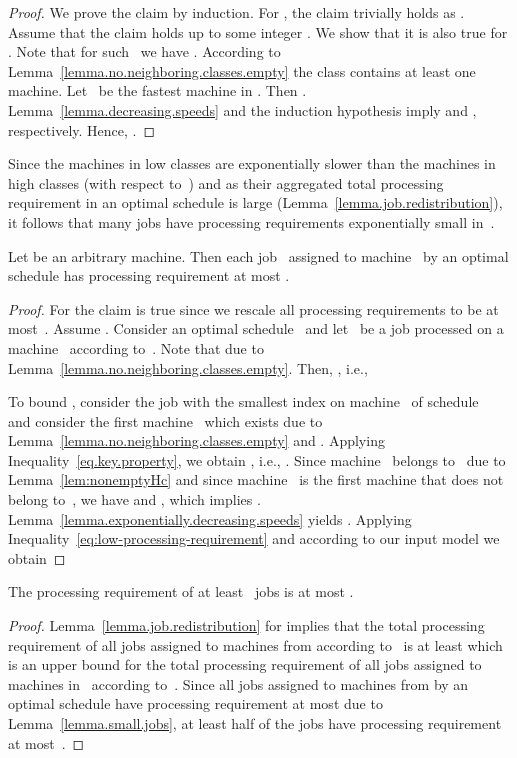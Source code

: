 \documentclass[a4paper,11pt,fleqn]{article}
\begin{document}
\begin{proof}
We prove the claim by induction. For , the claim trivially holds as . Assume that the claim holds up to some integer . We show that it is also true for . Note that for such~ we have . According to Lemma~\ref{lemma.no.neighboring.classes.empty} the class  contains at least one machine. Let~ be the fastest machine in . Then . Lemma~\ref{lemma.decreasing.speeds} and the induction hypothesis imply  and , respectively. Hence, .
\end{proof}

Since the machines in low classes are exponentially slower than the machines in high classes (with respect to~) and as their aggregated total processing requirement in an optimal schedule is large (Lemma~\ref{lemma.job.redistribution}), it follows that many jobs have processing requirements exponentially small in~. 

\begin{lemma}
\label{lemma.small.jobs}
Let  be an arbitrary machine. Then each job~ assigned to machine~ by an optimal schedule has processing requirement at most .
\end{lemma}

\begin{proof}
For  the claim is true since we rescale all processing requirements to be at most~. Assume . Consider an optimal schedule~ and
let~ be a job processed on a machine~ according to~. Note that  due to Lemma~\ref{lemma.no.neighboring.classes.empty}. Then, , i.e.,

To bound , consider the job  with the smallest index on machine~ of schedule~ and consider the first machine~ which exists due to Lemma~\ref{lemma.no.neighboring.classes.empty} and . Applying Inequality~\eqref{eq.key.property}, we obtain , i.e., . Since machine~ belongs to~ due to Lemma~\ref{lem:nonemptyHc} and since machine~ is the first machine that does not belong to~, we have  and , which implies . Lemma~\ref{lemma.exponentially.decreasing.speeds} yields . Applying Inequality~\ref{eq:low-processing-requirement} and  according to our input model we obtain

\end{proof}

\begin{cor}
\label{corol.many.small.jobs}
The processing requirement of at least~ jobs is at most .
\end{cor}

\begin{proof}
Lemma~\ref{lemma.job.redistribution} for  implies that the total
processing requirement of all jobs assigned to machines from  according to~ is at least 
which is an upper bound for the total processing requirement of all jobs
assigned to machines in~ according to~. Since all jobs assigned to machines from  by an optimal schedule have processing requirement at most  due to Lemma~\ref{lemma.small.jobs}, at
least half of the jobs have processing requirement at most~.
\end{proof}
\end{document}
